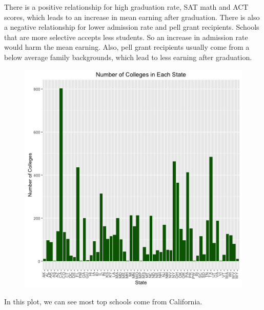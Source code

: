 \documentclass{article}
\begin{document}
There is a positive relationship for high graduation rate, SAT math and ACT scores, which leads to an increase in mean earning after graduation. There is also a negative relationship for lower admission rate and pell grant recipients. Schools that are more selective accepts less students. So an increase in admission rate would harm the mean earning. Also, pell grant recipients usually come from a below average family backgrounds, which lead to less earning after graduation. 


\begin{figure}[h!]
\includegraphics{../images/college-frequency.png}
\end{figure}
In this plot, we can see most top schools come from California. 
\end{document}
